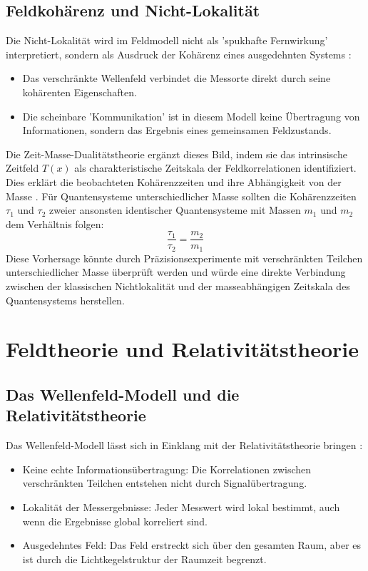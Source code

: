 \documentclass[12pt,a4paper]{article}
\newcommand{\Tfield}{T(x)}
\begin{document}
	\subsection{Feldkohärenz und Nicht-Lokalität}
	Die Nicht-Lokalität wird im Feldmodell nicht als 'spukhafte Fernwirkung' interpretiert, sondern als Ausdruck der Kohärenz eines ausgedehnten Systems \cite{Zeilinger2010}:
	\begin{itemize}
		\item Das verschränkte Wellenfeld verbindet die Messorte direkt durch seine kohärenten Eigenschaften.
		\item Die scheinbare 'Kommunikation' ist in diesem Modell keine Übertragung von Informationen, sondern das Ergebnis eines gemeinsamen Feldzustands.
	\end{itemize}
	Die Zeit-Masse-Dualitätstheorie ergänzt dieses Bild, indem sie das intrinsische Zeitfeld \(\Tfield\) als charakteristische Zeitskala der Feldkorrelationen identifiziert. Dies erklärt die beobachteten Kohärenzzeiten und ihre Abhängigkeit von der Masse \cite{Pascher2024}. Für Quantensysteme unterschiedlicher Masse sollten die Kohärenzzeiten \(\tau_1\) und \(\tau_2\) zweier ansonsten identischer Quantensysteme mit Massen \(m_1\) und \(m_2\) dem Verhältnis folgen:
	\begin{equation}
		\frac{\tau_1}{\tau_2} = \frac{m_2}{m_1}
	\end{equation}
	Diese Vorhersage könnte durch Präzisionsexperimente mit verschränkten Teilchen unterschiedlicher Masse überprüft werden und würde eine direkte Verbindung zwischen der klassischen Nichtlokalität und der masseabhängigen Zeitskala des Quantensystems herstellen.
	
	\section{Feldtheorie und Relativitätstheorie}
	\subsection{Das Wellenfeld-Modell und die Relativitätstheorie}
	Das Wellenfeld-Modell lässt sich in Einklang mit der Relativitätstheorie bringen \cite{Maudlin2011}:
	\begin{itemize}
		\item Keine echte Informationsübertragung: Die Korrelationen zwischen verschränkten Teilchen entstehen nicht durch Signalübertragung.
		\item Lokalität der Messergebnisse: Jeder Messwert wird lokal bestimmt, auch wenn die Ergebnisse global korreliert sind.
		\item Ausgedehntes Feld: Das Feld erstreckt sich über den gesamten Raum, aber es ist durch die Lichtkegelstruktur der Raumzeit begrenzt.
	\end{itemize}
	
\end{document}
